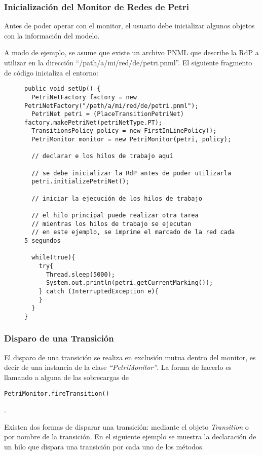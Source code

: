 \subsubsection{Inicialización del Monitor de Redes de Petri}

Antes de poder operar con el monitor, el usuario debe inicializar algunos
objetos con la información del modelo.

A modo de ejemplo, se asume que existe un archivo PNML que describe la RdP a
utilizar en la dirección ``/path/a/mi/red/de/petri.pnml''. El siguiente
fragmento de código inicializa  el entorno:

\begin{figure}[H]
\centering
\begin{verbatim}
public void setUp() {
  PetriNetFactory factory = new PetriNetFactory("/path/a/mi/red/de/petri.pnml");
  PetriNet petri = (PlaceTransitionPetriNet) factory.makePetriNet(petriNetType.PT);
  TransitionsPolicy policy = new FirstInLinePolicy();
  PetriMonitor monitor = new PetriMonitor(petri, policy);
  
  // declarar e los hilos de trabajo aquí
  
  // se debe inicializar la RdP antes de poder utilizarla
  petri.initializePetriNet();
  
  // iniciar la ejecución de los hilos de trabajo
  
  // el hilo principal puede realizar otra tarea
  // mientras los hilos de trabajo se ejecutan
  // en este ejemplo, se imprime el marcado de la red cada 5 segundos
  
  while(true){
    try{
      Thread.sleep(5000);
      System.out.println(petri.getCurrentMarking());
    } catch (InterruptedException e){
    }
  }
}
\end{verbatim}
\end{figure}

\subsubsection{Disparo de una Transición}

El disparo de una transición se realiza en exclusión mutua dentro del monitor,
es decir de una instancia de la clase \textit{``PetriMonitor''}. La forma de
hacerlo es llamando a alguna de las sobrecargas de 
\begin{verbatim}
PetriMonitor.fireTransition()
\end{verbatim}.

Existen dos formas de disparar una transición: mediante el objeto
\textit{Transition} o por nombre de la transición.
En el siguiente ejemplo se muestra la declaración de un hilo que dispara una
transición por cada uno de los métodos.

